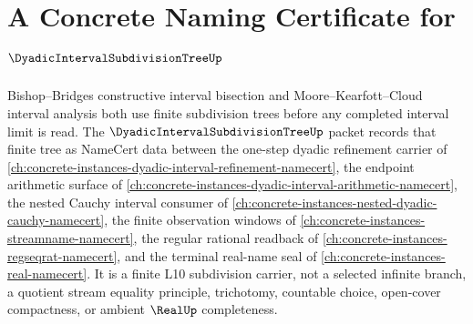 \chapter{A Concrete Naming Certificate for $\DyadicIntervalSubdivisionTreeUp$}
\label{ch:concrete-instances-dyadic-interval-subdivision-tree-namecert}

Bishop--Bridges constructive interval bisection and Moore--Kearfott--Cloud interval analysis both use finite subdivision trees before any completed interval limit is read. The $\DyadicIntervalSubdivisionTreeUp$ packet records that finite tree as NameCert data between the one-step dyadic refinement carrier of \autoref{ch:concrete-instances-dyadic-interval-refinement-namecert}, the endpoint arithmetic surface of \autoref{ch:concrete-instances-dyadic-interval-arithmetic-namecert}, the nested Cauchy interval consumer of \autoref{ch:concrete-instances-nested-dyadic-cauchy-namecert}, the finite observation windows of \autoref{ch:concrete-instances-streamname-namecert}, the regular rational readback of \autoref{ch:concrete-instances-regseqrat-namecert}, and the terminal real-name seal of \autoref{ch:concrete-instances-real-namecert}. It is a finite L10 subdivision carrier, not a selected infinite branch, a quotient stream equality principle, trichotomy, countable choice, open-cover compactness, or ambient $\RealUp$ completeness.

